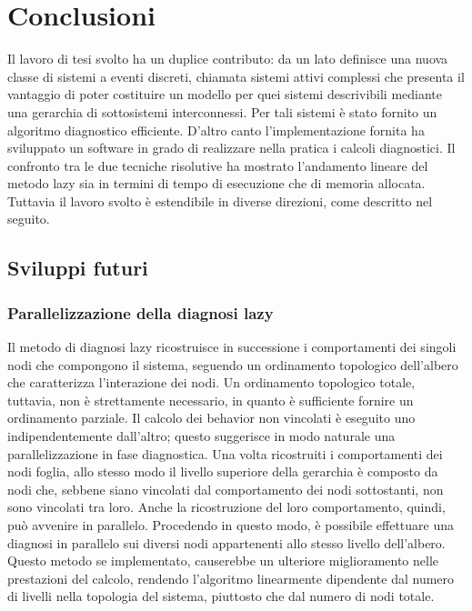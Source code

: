\chapter{Conclusioni}
Il lavoro di tesi svolto ha un duplice contributo: da un lato definisce una nuova classe di sistemi a eventi discreti, chiamata sistemi attivi complessi che presenta il vantaggio di poter costituire un modello per quei sistemi descrivibili mediante una gerarchia di sottosistemi interconnessi. Per tali sistemi è stato fornito un algoritmo diagnostico efficiente. D'altro canto l'implementazione fornita ha sviluppato un software in grado di realizzare nella pratica i calcoli diagnostici. Il confronto tra le due tecniche risolutive ha mostrato l'andamento lineare del metodo lazy sia in termini di tempo di esecuzione che di memoria allocata. Tuttavia il lavoro svolto è estendibile in diverse direzioni, come descritto nel seguito.

\section{Sviluppi futuri}

\subsection{Parallelizzazione della diagnosi lazy}
Il metodo di diagnosi lazy ricostruisce in successione i comportamenti dei singoli nodi che compongono il sistema, seguendo un ordinamento topologico dell'albero che caratterizza l'interazione dei nodi. Un ordinamento topologico totale, tuttavia, non è strettamente necessario, in quanto è sufficiente fornire un ordinamento parziale. Il calcolo dei behavior non vincolati è eseguito uno indipendentemente dall'altro; questo suggerisce in modo naturale una parallelizzazione in fase diagnostica. Una volta ricostruiti i comportamenti dei nodi foglia, allo stesso modo il livello superiore della gerarchia è composto da nodi che, sebbene siano vincolati dal comportamento dei nodi sottostanti, non sono vincolati tra loro. Anche la ricostruzione del loro comportamento, quindi, può avvenire in parallelo. Procedendo in questo modo, è possibile effettuare una diagnosi in parallelo sui diversi nodi appartenenti allo stesso livello dell'albero. Questo metodo se implementato, causerebbe un ulteriore miglioramento nelle prestazioni del calcolo, rendendo l'algoritmo linearmente dipendente dal numero di livelli nella topologia del sistema, piuttosto che dal numero di nodi totale. 

